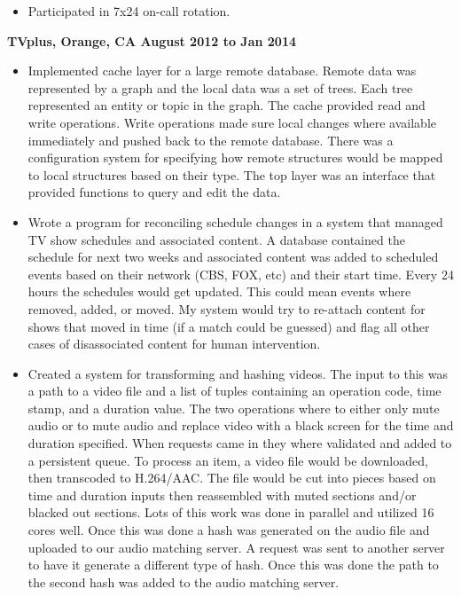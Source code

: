 \documentclass{res}
\begin{document}
\begin{resume}
\begin{itemize}
\item

    	Participated in 7x24 on-call rotation.

\end{itemize}

{\large \bf TVplus, Orange, CA \hfill August 2012 to Jan 2014}

\begin{itemize}

\item
	Implemented cache layer for a large remote database.  Remote
	data was represented by a graph and the local data was a
	set of trees.  Each tree represented an entity or topic in
	the graph.  The cache provided read and write operations.  Write
	operations made sure local changes where available immediately and
	pushed back to the remote database.  There was a configuration
	system for specifying how remote structures would be mapped
	to local structures based on their type.  The top layer was an
	interface that provided functions to query and edit the data.

\item
	Wrote a program for reconciling schedule changes in a system
	that managed TV show schedules and associated content.	A database
	contained the schedule for next two weeks and associated content
	was added to scheduled events based on their network (CBS, FOX,
	etc) and their start time.  Every 24 hours the schedules would
	get updated.  This could mean events where removed, added,
	or moved.  My system would try to re-attach content for shows
	that moved in time (if a match could be guessed) and flag all
	other cases of disassociated content for human intervention.
\item
	Created a system for transforming and hashing videos.  The
	input to this was a path to a video file and a list of tuples
	containing an operation code, time stamp, and a duration value.
	The two operations where to either only mute audio or to mute
	audio and replace video with a black screen for the time and
	duration specified.  When requests came in they where validated
	and added to a persistent queue.  To process an item, a video
	file would be downloaded, then transcoded to H.264/AAC.  The file
	would be cut into pieces based on time and duration inputs then
	reassembled with muted sections and/or blacked out sections.
	Lots of this work was done in parallel and utilized 16 cores well.
	Once this was done a hash was generated on the audio file and
	uploaded to our audio matching server.	A request was sent to
	another server to have it generate a different type of hash.
	Once this was done the path to the second hash was added to the
	audio matching server.


\end{itemize}
\end{resume}
\end{document}
